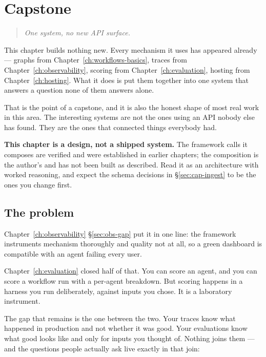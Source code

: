 \chapter{Capstone}
\label{ch:capstone}

\begin{quote}\itshape
One system, no new API surface.
\end{quote}

\noindent
This chapter builds nothing new. Every mechanism it uses has appeared already ---
graphs from Chapter~\ref{ch:workflows-basics}, traces from
Chapter~\ref{ch:observability}, scoring from Chapter~\ref{ch:evaluation}, hosting
from Chapter~\ref{ch:hosting}. What it does is put them together into one system
that answers a question none of them answers alone.

That is the point of a capstone, and it is also the honest shape of most real
work in this area. The interesting systems are not the ones using an API nobody
else has found. They are the ones that connected things everybody had.

\begin{verifybox}
\textbf{This chapter is a design, not a shipped system.} The framework calls it
composes are verified and were established in earlier chapters; the composition
is the author's and has not been built as described. Read it as an architecture
with worked reasoning, and expect the schema decisions in
\S\ref{sec:cap-ingest} to be the ones you change first.
\end{verifybox}

\section{The problem}
\label{sec:cap-problem}

Chapter~\ref{ch:observability} \S\ref{sec:obs-gap} put it in one line: the
framework instruments mechanism thoroughly and quality not at all, so a green
dashboard is compatible with an agent failing every user.

Chapter~\ref{ch:evaluation} closed half of that. You can score an agent, and you
can score a workflow run with a per-agent breakdown. But scoring happens in a
harness you run deliberately, against inputs you chose. It is a laboratory
instrument.

The gap that remains is the one between the two. Your traces know what happened
in production and not whether it was good. Your evaluations know what good looks
like and only for inputs you thought of. Nothing joins them --- and the questions
people actually ask live exactly in that join:


